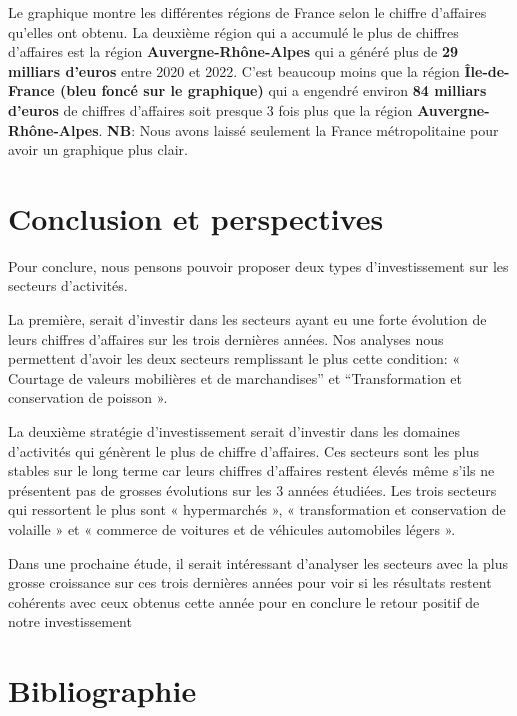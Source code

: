 \documentclass[mstat,12pt]{unswthesis}
\begin{document}
Le graphique montre les différentes régions de France selon le chiffre
d'affaires qu'elles ont obtenu. La deuxième région qui a accumulé le
plus de chiffres d'affaires est la région \textbf{Auvergne-Rhône-Alpes}
qui a généré plus de \textbf{29 milliars d'euros} entre 2020 et 2022.
C'est beaucoup moins que la région \textbf{Île-de-France (bleu foncé sur
le graphique)} qui a engendré environ \textbf{84 milliars d'euros} de
chiffres d'affaires soit presque 3 fois plus que la région
\textbf{Auvergne-Rhône-Alpes}. \textbf{NB}: Nous avons laissé seulement
la France métropolitaine pour avoir un graphique plus clair. \bigskip

\hypertarget{conclusion-et-perspectives}{%
\chapter{Conclusion et perspectives}\label{conclusion-et-perspectives}}

Pour conclure, nous pensons pouvoir proposer deux types d'investissement
sur les secteurs d'activités.

La première, serait d'investir dans les secteurs ayant eu une forte
évolution de leurs chiffres d'affaires sur les trois dernières années.
Nos analyses nous permettent d'avoir les deux secteurs remplissant le
plus cette condition: « Courtage de valeurs mobilières et de
marchandises'' et ``Transformation et conservation de poisson ».

La deuxième stratégie d'investissement serait d'investir dans les
domaines d'activités qui génèrent le plus de chiffre d'affaires. Ces
secteurs sont les plus stables sur le long terme car leurs chiffres
d'affaires restent élevés même s'ils ne présentent pas de grosses
évolutions sur les 3 années étudiées. Les trois secteurs qui ressortent
le plus sont « hypermarchés », « transformation et conservation de
volaille » et « commerce de voitures et de véhicules automobiles légers
».

Dans une prochaine étude, il serait intéressant d'analyser les secteurs
avec la plus grosse croissance sur ces trois dernières années pour voir
si les résultats restent cohérents avec ceux obtenus cette année pour en
conclure le retour positif de notre investissement

\hypertarget{bibliographie}{%
\chapter*{Bibliographie}\label{bibliographie}}
\end{document}
